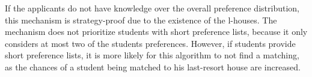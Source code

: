 If the applicants do not have knowledge over the overall preference distribution, this mechanism is strategy-proof due to the existence of the l-houses. The mechanism does not prioritize students with short preference lists, because it only considers at most two of the students preferences. However, if students provide short preference lists, it is more likely for this algorithm to not find a matching, as the chances of a student being matched to his last-resort house are increased.
